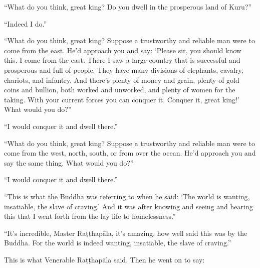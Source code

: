 \documentclass[12pt,openany]{book}%
\begin{document}
“What do you think, great king? Do you dwell in the prosperous land of Kuru?” 

“Indeed I do.” 

“What do you think, great king? Suppose a trustworthy and reliable man were to come from the east. He’d approach you and say: ‘Please sir, you should know this. I come from the east. There I saw a large country that is successful and prosperous and full of people. They have many divisions of elephants, cavalry, chariots, and infantry. And there’s plenty of money and grain, plenty of gold coins and bullion, both worked and unworked, and plenty of women for the taking. With your current forces you can conquer it. Conquer it, great king!’ What would you do?” 

“I would conquer it and dwell there.” 

“What do you think, great king? Suppose a trustworthy and reliable man were to come from the west, north, south, or from over the ocean. He’d approach you and say the same thing. What would you do?” 

“I would conquer it and dwell there.” 

“This is what the Buddha was referring to when he said: ‘The world is wanting, insatiable, the slave of craving.’ And it was after knowing and seeing and hearing this that I went forth from the lay life to homelessness.” 

“It’s incredible, Master \textsanskrit{Raṭṭhapāla}, it’s amazing, how well said this was by the Buddha. For the world is indeed wanting, insatiable, the slave of craving.” 

This is what Venerable \textsanskrit{Raṭṭhapāla} said. Then he went on to say: 
\end{document}
